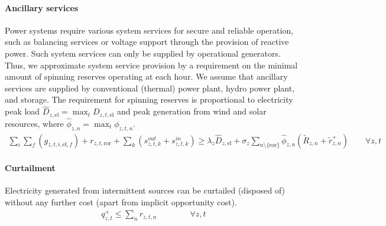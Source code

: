 \documentclass[review, 3p, times, 12pt]{elsarticle} %
\begin{document}
\paragraph{Ancillary services}
Power systems require various system services for secure and reliable operation, such as balancing services or
voltage support through the provision of reactive power. Such system services can only be supplied by operational
generators.
Thus, we approximate system service provision by a requirement on the minimal amount of spinning reserves operating
at each hour.
We assume that ancillary services are supplied by conventional (thermal) power plant, hydro power plant, and storage.
The requirement for spinning reserves is proportional to electricity peak load
$\widehat{D}_{z,\text{el}} = \max_{t} D_{z,t,\text{el}}$ and peak generation from wind and solar resources,
where $\widehat{\phi}_{z,n} = \max_{t} \phi_{z,t,n}$.
\begin{align}
\sum_{i}\sum_{f}\left( g_{z,t,i,\text{el},f}\right) + r_{z,t,\text{ror}}
+ \sum_{k}\left( s^{out}_{z,t,k} + s^{in}_{z,t,k}\right)\geq \lambda_{z}\widehat{D}_{z,\text{el}}
+ \sigma_{z}\sum_{n\setminus \{ \text{ror}\}}\widehat{\phi}_{z,n} (\widetilde{R}_{z,n}
+\widetilde{r}^{+}_{z,n})\qquad \forall z,t
\end{align}

\paragraph{Curtailment}
Electricity generated from intermittent sources can be curtailed (disposed of) without any further cost (apart from
implicit opportunity cost).
\begin{align}
q^{+}_{z,t} \leq \sum_{n} r_{z,t,n} \qquad \qquad \forall z, t
\end{align}

\end{document}
